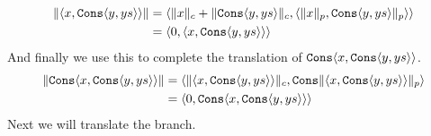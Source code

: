 %
\begin{align*}
  \|\langle x, \texttt{Cons}\langle y,ys\rangle\rangle\| &= \langle \|x\|_c + \|\texttt{Cons}\langle y,ys\rangle\|_c, \langle \|x\|_p,\texttt{Cons}\langle y,ys\rangle\|_p\rangle\rangle \\
                                                    &= \langle 0, \langle x,\texttt{Cons}\langle y,ys\rangle\rangle\rangle
\end{align*}
%
And finally we use this to complete the translation of $\texttt{Cons}\langle x,\texttt{Cons}\langle y,ys\rangle\rangle$.
%
\begin{align*}
  \|\texttt{Cons}\langle x,\texttt{Cons}\langle y,ys \rangle\rangle\| &= \langle \|\langle x, \texttt{Cons} \langle y,ys\rangle\rangle\|_c, \texttt{Cons}\|\langle x,\texttt{Cons}\langle y,ys\rangle\rangle\|_p\rangle \\
                                                            &= \langle 0, \texttt{Cons}\langle x,\texttt{Cons}\langle y,ys\rangle\rangle\rangle
\end{align*}
%
%
%
Next we will translate the  branch.

